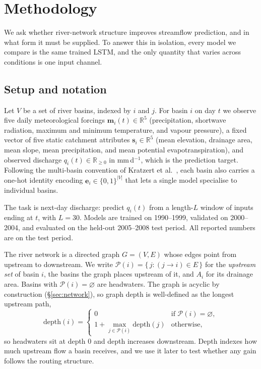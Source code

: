 \documentclass[11pt]{article}
\begin{document}
\section{Methodology}

We ask whether river-network structure improves streamflow prediction, and in what form it must be
supplied. To answer this in isolation, every model we compare is the same trained LSTM, and the only
quantity that varies across conditions is one input channel.

\subsection{Setup and notation}
\label{sec:setup}

Let $V$ be a set of river basins, indexed by $i$ and $j$. For basin $i$ on day $t$ we observe five
daily meteorological forcings $\mathbf{m}_i(t)\in\mathbb{R}^5$ (precipitation, shortwave radiation,
maximum and minimum temperature, and vapour pressure), a fixed vector of five static catchment
attributes $\mathbf{s}_i\in\mathbb{R}^5$ (mean elevation, drainage area, mean slope, mean
precipitation, and mean potential evapotranspiration), and observed discharge $q_i(t)\in\mathbb{R}_{\ge 0}$
in mm\,d$^{-1}$, which is the prediction target. Following the multi-basin convention of
Kratzert et al.~\cite{kratzert2019}, each basin also carries a one-hot identity encoding
$\mathbf{e}_i\in\{0,1\}^{|V|}$ that lets a single model specialise to individual basins.

The task is next-day discharge: predict $q_i(t)$ from a length-$L$ window of inputs ending at $t$,
with $L=30$. Models are trained on 1990--1999, validated on 2000--2004, and evaluated on the
held-out 2005--2008 test period. All reported numbers are on the test period.

The river network is a directed graph $G=(V,E)$ whose edges point from upstream to downstream. We
write $\mathcal{P}(i)=\{\,j : (j\!\to\! i)\in E\,\}$ for the \emph{upstream set} of basin $i$, the
basins the graph places upstream of it, and $A_i$ for its drainage area. Basins with
$\mathcal{P}(i)=\varnothing$ are headwaters. The graph is acyclic by construction (\S\ref{sec:network}),
so graph depth is well-defined as the longest upstream path,
\begin{equation}
\label{eq:depth}
\mathrm{depth}(i) =
\begin{cases}
0 & \text{if } \mathcal{P}(i)=\varnothing,\\[2pt]
1 + \max_{j\in\mathcal{P}(i)} \mathrm{depth}(j) & \text{otherwise,}
\end{cases}
\end{equation}
so headwaters sit at depth $0$ and depth increases downstream. Depth indexes how much upstream flow
a basin receives, and we use it later to test whether any gain follows the routing structure.
\end{document}
